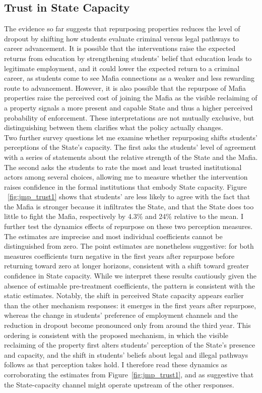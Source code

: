 \documentclass[12pt]{article}
\theoremstyle{plain}
\theoremstyle{plain}
\theoremstyle{plain}
\theoremstyle{definition}
\theoremstyle{plain}
\theoremstyle{definition}
\theoremstyle{plain}
\theoremstyle{remark}
\theoremstyle{definition}
\theoremstyle{definition}
\theoremstyle{plain}
\begin{document}
	\subsection{Trust in State Capacity}
The evidence so far suggests that repurposing properties reduces the level of dropout by shifting how students evaluate criminal versus legal pathways to career advancement. It is possible that the interventions raise the expected returns from education by strengthening students' belief that education leads to legitimate employment, and it could lower the expected return to a criminal career, as students come to see Mafia connections as a weaker and less rewarding route to advancement. However, it is also possible that the repurpose of Mafia properties raise the perceived cost of joining the Mafia as the visible reclaiming of a property signals a more present and capable State and thus a higher perceived probability of enforcement. These interpretations are not mutually exclusive, but distinguishing between them clarifies what the policy actually changes. \\

Two further survey questions let me examine whether repurposing shifts students' perceptions of the State's capacity. The first asks the students' level of agreement with a series of statements about the relative strength of the State and the Mafia. The second asks the students to rate the most and least trusted institutional actors among several choices, allowing me to measure whether the intervention raises confidence in the formal institutions that embody State capacity. Figure ~\ref{fig:jmp_trust1} shows that students' are less likely to agree with the fact that the Mafia is stronger because it infiltrates the State, and that the State does too little to fight the Mafia, respectively by 4.3\% and 24\% relative to the mean. I further test the dynamics effects of repurpose on these two perception measures. The estimates are imprecise and most individual coefficients cannot be distinguished from zero. The point estimates are nonetheless suggestive: for both measures coefficients  turn negative in the first years after repurpose before returning toward zero at longer horizons, consistent with a shift toward greater confidence in State capacity. While we interpret these results cautiously given the absence of estimable pre-treatment coefficients, the pattern is consistent with the static estimates. Notably, the shift in perceived State capacity appears earlier than the other mechanism responses: it emerges in the first years after repurpose, whereas the change in students' preference of employment channels and the reduction in dropout become pronounced only from around the third year. This ordering is consistent with the proposed mechanism, in which the visible reclaiming of the property first alters students' perception of the State's presence and capacity, and the shift in students' beliefs about legal and illegal pathways follows as that perception takes hold. I therefore read these dynamics as corroborating the estimates from Figure~\ref{fig:jmp_trust1}, and as suggestive that the State-capacity channel might operate upstream of the other responses.
\end{document}
